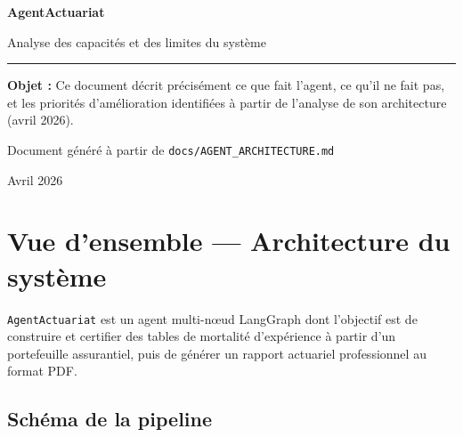 \documentclass[12pt,a4paper]{article}
\begin{document}
\begin{titlepage}
  \centering
  \vspace*{2cm}
  {\Huge\bfseries\color{agentblue} AgentActuariat\par}
  \vspace{0.5cm}
  {\large\color{gray} Analyse des capacités et des limites du système\par}
  \vspace{2cm}
  \rule{0.6\textwidth}{0.5pt}
  \vspace{1cm}

  \begin{tcolorbox}[colback=agentgray, colframe=agentblue!30, width=0.75\textwidth, arc=6pt]
    \centering
    \textbf{Objet :} Ce document décrit précisément ce que fait l'agent,
    ce qu'il ne fait pas, et les priorités d'amélioration identifiées
    à partir de l'analyse de son architecture (avril 2026).
  \end{tcolorbox}

  \vfill
  {\small\color{gray} Document généré à partir de \texttt{docs/AGENT\_ARCHITECTURE.md}\par}
  {\small\color{gray} Avril 2026\par}
\end{titlepage}

\tableofcontents
\newpage

\section{Vue d'ensemble — Architecture du système}

\texttt{AgentActuariat} est un agent multi-nœud LangGraph dont l'objectif est
de construire et certifier des tables de mortalité d'expérience à partir d'un
portefeuille assurantiel, puis de générer un rapport actuariel professionnel au
format PDF.

\bigskip

\subsection{Schéma de la pipeline}
\end{document}
